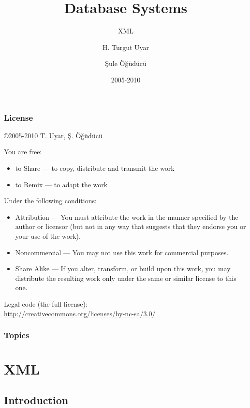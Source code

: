 \documentclass[dvipsnames]{beamer}
\title{Database Systems}
\subtitle{XML}
\author{H. Turgut Uyar \and Şule Öğüdücü}
\date{2005-2010}
\theoremstyle{plain}
\begin{document}
\begin{frame}
  \titlepage
\end{frame}

\begin{frame}
  \frametitle{License}

  \hfill
  \copyright 2005-2010 T. Uyar, Ş. Öğüdücü

  \vfill
  \begin{tiny}
    You are free:
    \begin{itemize}
      \item to Share — to copy, distribute and transmit the work
      \item to Remix — to adapt the work
    \end{itemize}

    Under the following conditions:
    \begin{itemize}
      \item Attribution — You must attribute the work in the manner specified by
        the author or licensor (but not in any way that suggests that they
        endorse you or your use of the work).

      \item Noncommercial — You may not use this work for commercial purposes.

      \item Share Alike — If you alter, transform, or build upon this work, you
        may distribute the resulting work only under the same or similar license
        to this one.
    \end{itemize}
  \end{tiny}

  \vfill
  Legal code (the full license):\\
  \url{http://creativecommons.org/licenses/by-nc-sa/3.0/}
\end{frame}

\begin{frame}
  \frametitle{Topics}
  \tableofcontents
\end{frame}

\section{XML}

\subsection{Introduction}
\end{document}
